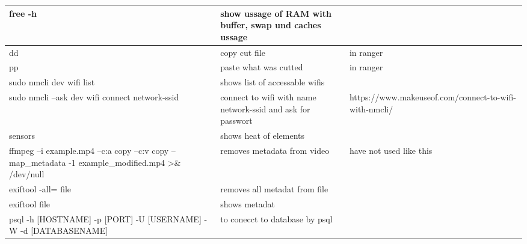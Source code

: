 \documentclass[12pt]{article}
\begin{document}
\begin{tabular}{| p{6.5cm} | p{6.5cm} | p{6.5cm} |}
    \hline
    free -h & show ussage of RAM with buffer, swap und caches ussage & \\
    \hline 
    dd & copy cut file & in ranger \\
    \hline
    pp & paste what was cutted & in ranger \\
    \hline
    sudo nmcli dev wifi list & shows list of accessable wifis &\\
    \hline
    sudo nmcli --ask dev wifi connect network-ssid & connect to wifi with name network-ssid and ask for passwort & https://www.makeuseof.com/connect-to-wifi-with-nmcli/ \\
    \hline
    sensors & shows heat of elements & \\
    \hline
    ffmpeg –i example.mp4 –c:a copy –c:v copy –map\_metadata -1 example\_modified.mp4 >\& /dev/null & removes metadata from video & have not used like this \\
    \hline
    exiftool -all= file & removes all metadat from file & \\
    \hline 
    exiftool file & shows metadat & \\
    \hline
    psql -h [HOSTNAME] -p [PORT] -U [USERNAME] -W -d [DATABASENAME] & to conecct to database by psql & \\
    \hline
\end{tabular}
\end{document}

